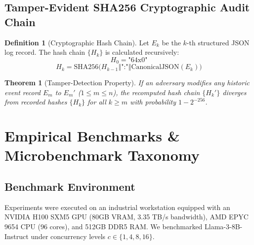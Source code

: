 \documentclass[10pt,twocolumn,a4paper]{article}
\newtheorem{theorem}{Theorem}[section]
\theoremstyle{definition}
\newtheorem{definition}{Definition}[section]
\theoremstyle{remark}
\begin{document}
\subsection{Tamper-Evident SHA256 Cryptographic Audit Chain}

\begin{definition}[Cryptographic Hash Chain]
Let $E_k$ be the $k$-th structured JSON log record. The hash chain $\{H_k\}$ is calculated recursively:
\begin{equation}
H_0 = \text{"64x0"}
\end{equation}
\begin{equation}
H_k = \text{SHA256}\Big( H_{k-1} \mathbin{\Vert} \text{":"} \mathbin{\Vert} \text{CanonicalJSON}(E_k) \Big)
\end{equation}
\end{definition}

\begin{theorem}[Tamper-Detection Property]
If an adversary modifies any historic event record $E_m$ to $E_m'$ ($1 \le m \le n$), the recomputed hash chain $\{H_k'\}$ diverges from recorded hashes $\{H_k\}$ for all $k \ge m$ with probability $1 - 2^{-256}$.
\end{theorem}

\section{Empirical Benchmarks \& Microbenchmark Taxonomy}
\label{sec:experiments}

\subsection{Benchmark Environment}
Experiments were executed on an industrial workstation equipped with an NVIDIA H100 SXM5 GPU (80GB VRAM, 3.35 TB/s bandwidth), AMD EPYC 9654 CPU (96 cores), and 512GB DDR5 RAM. We benchmarked Llama-3-8B-Instruct under concurrency levels $c \in \{1, 4, 8, 16\}$.
\end{document}
